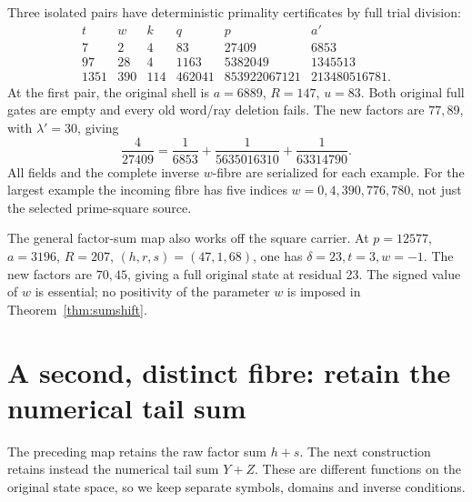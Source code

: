 Three isolated pairs have deterministic primality certificates by full trial
division:
\[
\begin{array}{r|r|r|r|r|r}
 t&w&k&q&p&a'\\\hline
7&2&4&83&27409&6853\\
97&28&4&1163&5382049&1345513\\
1351&390&114&462041&853922067121&213480516781.
\end{array}
\]
At the first pair, the original shell is $a=6889$, $R=147$, $u=83$.
Both original full gates are empty and every old word/ray deletion fails.
The new factors are $77,89$, with $\lambda'=30$, giving
\begin{equation}\label{eq:27409}
 \frac4{27409}=\frac1{6853}+\frac1{5635016310}+\frac1{63314790}.
\end{equation}
All fields and the complete inverse $w$-fibre are serialized for each example.
For the largest example the incoming fibre has five indices
$w=0,4,390,776,780$, not just the selected prime-square source.



The general factor-sum map also works off the square carrier. At $p=12577$,
$a=3196$, $R=207$, $(h,r,s)=(47,1,68)$, one has $\delta=23,t=3,w=-1$.
The new factors are $70,45$, giving a full original state at residual 23.
The signed value of $w$ is essential; no positivity of the parameter $w$
is imposed in Theorem~\ref{thm:sumshift}.

\section{A second, distinct fibre: retain the numerical tail sum}\label{sec:tailsum}
The preceding map retains the raw factor sum $h+s$.  The next construction
retains instead the numerical tail sum $Y+Z$.  These are different functions
on the original state space, so we keep separate symbols, domains and inverse
conditions.

